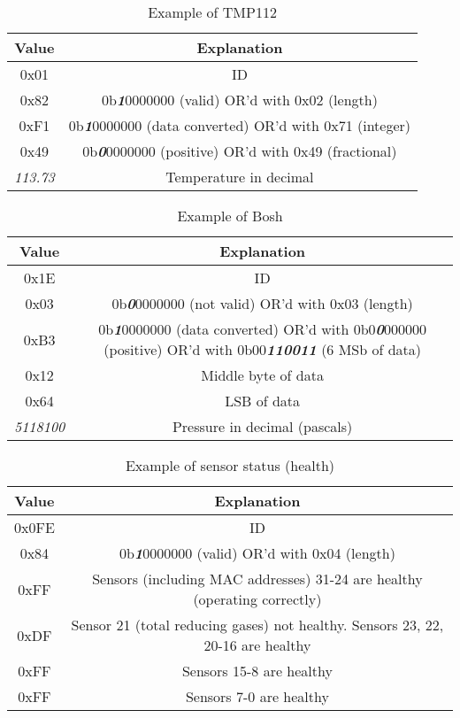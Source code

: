 \begin{table}[H]
    \centering
    {
    \begin{tabular}{|c c|}
        \hline
        \textbf{Value} & \textbf{Explanation}\\
        \hline
        \hline
        0x01 & ID\\
        0x82 & 0b\textbf{\textit{1}}0000000 (valid) OR'd with 0x02 (length)\\
        0xF1 & 0b\textbf{\textit{1}}0000000 (data converted) OR'd with 0x71 (integer)\\
        0x49 & 0b\textbf{\textit{0}}0000000 (positive) OR'd with 0x49 (fractional)\\
        \textit{113.73} & Temperature in decimal\\
        \hline
    \end{tabular}
    }
    \caption{Example of TMP112}
\end{table}

\begin{table}[H]
    \centering
    {
    \begin{tabular}{|c c|}
        \hline
        \textbf{Value} & \textbf{Explanation}\\
        \hline
        \hline
        0x1E & ID\\
        0x03 & 0b\textbf{\textit{0}}0000000 (not valid) OR'd with 0x03 (length)\\
        0xB3 & 0b\textbf{\textit{1}}0000000 (data converted) OR'd with 0b0\textbf{\textit{0}}000000 (positive) OR'd with 0b00\textbf{\textit{110011}} (6 MSb of data)\\
        0x12 & Middle byte of data\\
        0x64 & LSB of data\\
        \textit{5118100} & Pressure in decimal (pascals)\\
        \hline
    \end{tabular}
    }
    \caption{Example of Bosh}
\end{table}

\begin{table}[H]
    \centering
    {
    \begin{tabular}{|c c|}
        \hline
        \textbf{Value} & \textbf{Explanation}\\
        \hline
        \hline
        0x0FE & ID\\
        0x84 & 0b\textbf{\textit{1}}0000000 (valid) OR'd with 0x04 (length)\\
        0xFF & Sensors (including MAC addresses) 31-24 are healthy (operating correctly)\\
        0xDF & Sensor 21 (total reducing gases) not healthy. Sensors 23, 22, 20-16 are healthy\\
        0xFF & Sensors 15-8 are healthy\\
        0xFF & Sensors 7-0 are healthy\\
        \hline
    \end{tabular}
    }
    \caption{Example of sensor status (health)}
\end{table}

